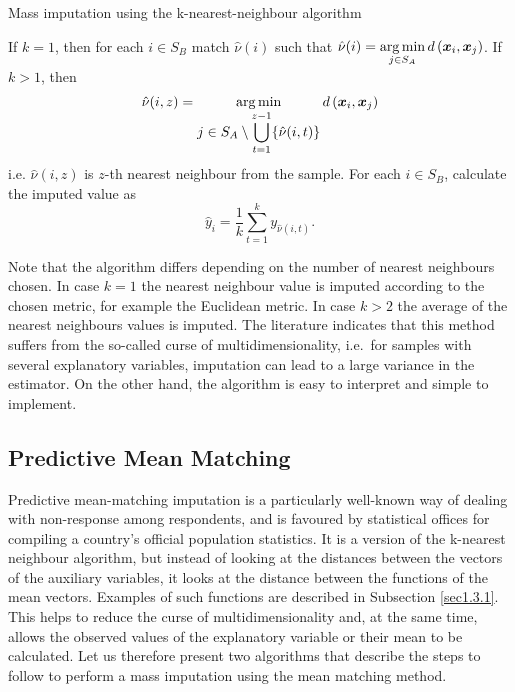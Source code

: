 \documentclass[
]{jss}
\begin{document}
\begin{algorithm}[H]
\caption{Mass imputation using the k-nearest-neighbour algorithm}
\label{algo-2}
\begin{algorithmic}[1]
\State If $k=1$, then for each $i \in S_B$ match $\hat{\nu}(i)$ such that
$\displaystyle \hat{\nu}(i)=
\operatornamewithlimits{arg\,min}_{j\in S_{A}}d\left(\boldsymbol{x}_i,\boldsymbol{x}_j\right)$.
\State If $k>1$, then
$$\hat{\nu}(i, z) = \operatornamewithlimits{arg\,min}_{\displaystyle j\in S_{A}\setminus\bigcup_{t=1}^{z-1}
\{\hat{\nu}(i, t)\}} d\left(\boldsymbol{x}_i, \boldsymbol{x}_j\right)$$
i.e. $\hat{\nu}(i, z)$ is $z$-th nearest neighbour from the sample.\;
\State For each $i \in S_B$, calculate the imputed value as
$$
\hat{y}_i = \frac{1}{k}\sum_{t=1}^{k}y_{\hat{\nu}(i, t)}.
$$
\end{algorithmic}
\end{algorithm}

Note that the algorithm differs depending on the number of nearest
neighbours chosen. In case \(k=1\) the nearest neighbour value is
imputed according to the chosen metric, for example the Euclidean
metric. In case \(k>2\) the average of the nearest neighbours values is
imputed. The literature indicates that this method suffers from the
so-called curse of multidimensionality, i.e.~for samples with several
explanatory variables, imputation can lead to a large variance in the
estimator. On the other hand, the algorithm is easy to interpret and
simple to implement.

\hypertarget{predictive-mean-matching}{%
\subsection{Predictive Mean Matching}\label{predictive-mean-matching}}

Predictive mean-matching imputation is a particularly well-known way of
dealing with non-response among respondents, and is favoured by
statistical offices for compiling a country's official population
statistics. It is a version of the k-nearest neighbour algorithm, but
instead of looking at the distances between the vectors of the auxiliary
variables, it looks at the distance between the functions of the mean
vectors. Examples of such functions are described in Subsection
\ref{sec1.3.1}. This helps to reduce the curse of multidimensionality
and, at the same time, allows the observed values of the explanatory
variable or their mean to be calculated. Let us therefore present two
algorithms that describe the steps to follow to perform a mass
imputation using the mean matching method.
\end{document}
